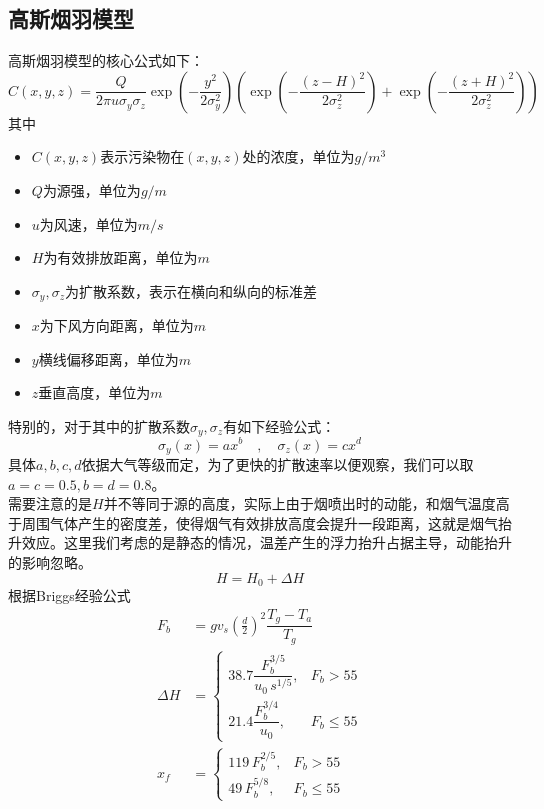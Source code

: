 \documentclass{article}
\begin{document}
	\subsection{高斯烟羽模型}
	高斯烟羽模型的核心公式如下：
	\[
	C(x, y, z) = \frac{Q}{2\pi u \sigma_y \sigma_z} 
	\exp\left( -\frac{y^2}{2\sigma_y^2} \right) 
	\left(
	\exp\left( -\frac{(z - H)^2}{2\sigma_z^2} \right)
	+ 
	\exp\left( -\frac{(z + H)^2}{2\sigma_z^2} \right)
	\right)
	\]
	其中
	\begin{itemize}
		\item $C(x,y,z)$表示污染物在$(x,y,z)$处的浓度，单位为$g/m^3$
		\item $Q$为源强，单位为$g/m$
		\item $u$为风速，单位为$m/s$
		\item $H$为有效排放距离，单位为$m$
		\item $ \sigma_y,\sigma_z $为扩散系数，表示在横向和纵向的标准差
		\item $x$为下风方向距离，单位为$m$
		\item $y$横线偏移距离，单位为$m$
		\item $z$垂直高度，单位为$m$
	\end{itemize}
	
	
	\indent 	特别的，对于其中的扩散系数$ \sigma_y,\sigma_z $有如下经验公式：
	\[ \sigma_y(x)=ax^b\hspace{1em} ,\hspace{1em} \sigma_z(x)=cx^d\]
	\indent 具体$a,b,c,d$依据大气等级而定，为了更快的扩散速率以便观察，我们可以取$a=c=0.5,b=d=0.8$。\\
	\indent 需要注意的是$H$并不等同于源的高度，实际上由于烟喷出时的动能，和烟气温度高于周围气体产生的密度差，使得烟气有效排放高度会提升一段距离，这就是烟气抬升效应。这里我们考虑的是静态的情况，温差产生的浮力抬升占据主导，动能抬升的影响忽略。\\
	\[ H=H_0+\Delta H \]
	\indent 根据Briggs经验公式
	\begin{align*}
		F_b&=gv_s(\frac{d}{2})^2\dfrac{T_g-T_a}{T_g}\\
		\Delta H &= 
		\begin{cases}
			38.7 \dfrac{F_b^{3/5}}{u_0 \, s^{1/5}}, & F_b > 55 \\[8pt]
			21.4 \dfrac{F_b^{3/4}}{u_0}, & F_b \leq 55
		\end{cases}\\
		x_f &= 
		\begin{cases}
			119 \, F_b^{2/5}, & F_b > 55 \\[8pt]
			49 \, F_b^{5/8}, & F_b \leq 55
		\end{cases}
	\end{align*}
	
\end{document}
